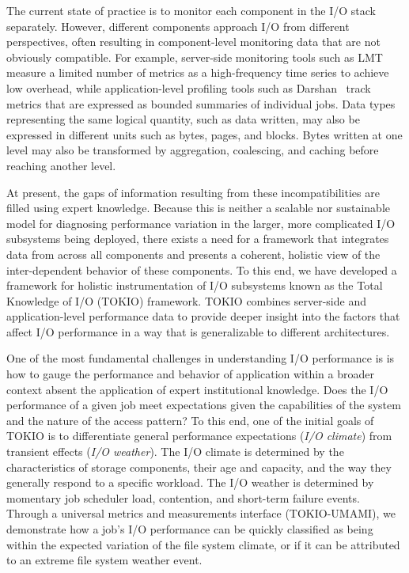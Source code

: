 \documentclass[conference,10pt,compsocconf]{IEEEtran}
\begin{document}

The current state of practice is to monitor each component in the I/O stack
separately.  However, different components approach I/O from different
perspectives, often resulting in component-level monitoring data that are not
obviously compatible.  For example, server-side monitoring tools such as
LMT~\cite{lmt} measure a limited number of metrics as a high-frequency time
series to achieve
low overhead, while application-level profiling tools such as
Darshan~\cite{carns200924} track metrics that are expressed as bounded
summaries of individual jobs.
Data types representing the same logical
quantity, such as data written, may also be expressed in different units such
as bytes, pages, and blocks.  Bytes written at one level may also be
transformed by aggregation, coalescing, and caching before reaching another
level.


At present, the gaps of information resulting from these incompatibilities are
filled using expert knowledge.  Because this is
neither a scalable nor sustainable model for diagnosing performance variation in
the larger, more complicated I/O subsystems being deployed, there exists a need
for a framework that integrates data from across all components and presents a
coherent, holistic view of the inter-dependent behavior of these components.  To
this end, we have developed a framework for holistic instrumentation of I/O
subsystems known as the Total Knowledge of I/O (TOKIO) framework.  TOKIO
combines server-side and application-level performance data to
provide deeper insight into the factors that affect I/O performance in a way
that is generalizable to different architectures.

One of the most fundamental challenges in understanding I/O performance
is is how to gauge the performance and behavior of application within a
broader context absent the application of expert institutional knowledge.
Does the I/O performance of a given job meet expectations given the
capabilities of the system and the nature of the access pattern?
To this end, one of the initial goals of TOKIO is to differentiate
general performance expectations (\emph{I/O climate}) from transient
effects (\emph{I/O weather}).  The I/O climate is determined by the
characteristics of storage components, their age and capacity, and the
way they generally respond to a specific workload.  The I/O weather is
determined by momentary job scheduler load, contention, and short-term
failure events.  Through a universal metrics and measurements interface
(TOKIO-UMAMI), we demonstrate how a job's I/O performance can be quickly
classified as being within the expected variation of the file system
climate, or if it can be attributed to an extreme file system weather
event.
\end{document}
